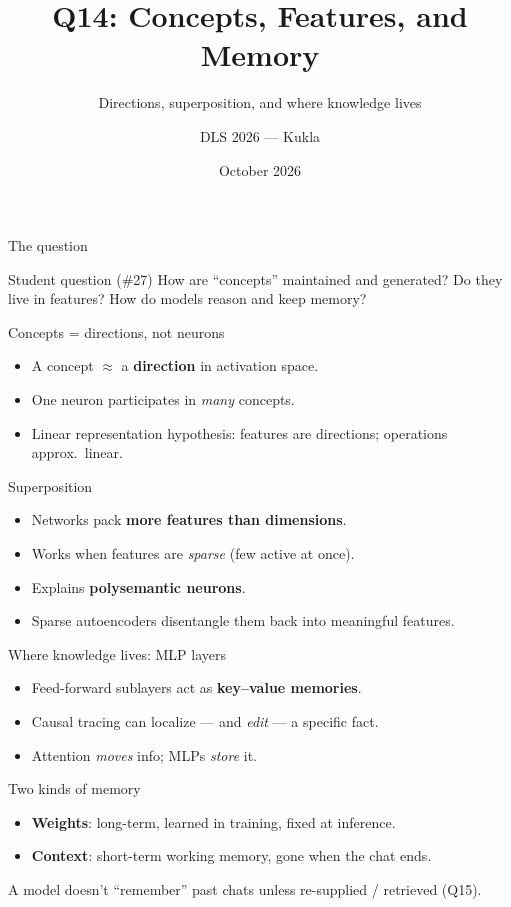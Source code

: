 \documentclass[aspectratio=169,10pt]{beamer}
\title{Q14: Concepts, Features, and Memory}
\subtitle{Directions, superposition, and where knowledge lives}
\author{DLS 2026 --- Kukla}
\date{October 2026}
\begin{document}
\maketitle

\begin{frame}{The question}
\begin{block}{Student question (\#27)}
How are ``concepts'' maintained and generated? Do they live in features? How do models reason and keep
memory?
\end{block}
\end{frame}
\begin{frame}{Concepts = directions, not neurons}
\begin{itemize}
\item A concept $\approx$ a \textbf{direction} in activation space.
\item One neuron participates in \emph{many} concepts.
\item Linear representation hypothesis: features are directions; operations approx.\ linear.
\end{itemize}
\end{frame}
\begin{frame}{Superposition}
\begin{itemize}
\item Networks pack \textbf{more features than dimensions}.
\item Works when features are \emph{sparse} (few active at once).
\item Explains \textbf{polysemantic neurons}.
\item Sparse autoencoders disentangle them back into meaningful features.
\end{itemize}
\end{frame}
\begin{frame}{Where knowledge lives: MLP layers}
\begin{itemize}
\item Feed-forward sublayers act as \textbf{key--value memories}.
\item Causal tracing can localize --- and \emph{edit} --- a specific fact.
\item Attention \emph{moves} info; MLPs \emph{store} it.
\end{itemize}
\end{frame}
\begin{frame}{Two kinds of memory}
\begin{itemize}
\item \textbf{Weights}: long-term, learned in training, fixed at inference.
\item \textbf{Context}: short-term working memory, gone when the chat ends.
\end{itemize}
\alert{A model doesn't ``remember'' past chats unless re-supplied / retrieved (Q15).}
\end{frame}
\end{document}
